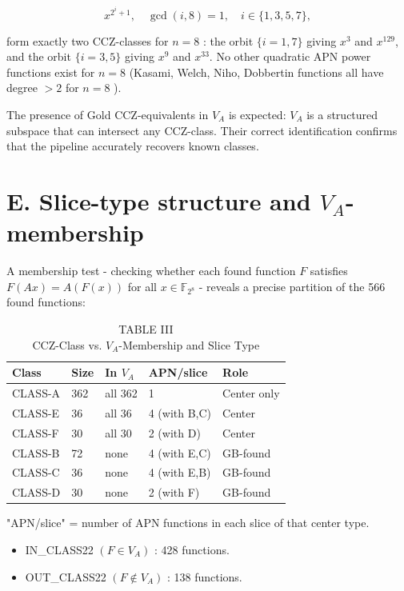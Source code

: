 \documentclass[10pt]{article}
\begin{document}
$$
x^{2^{i}+1}, \quad \operatorname{gcd}(i, 8)=1, \quad i \in\{1,3,5,7\},
$$

form exactly two CCZ-classes for $n=8$ : the orbit $\{i=1,7\}$ giving $x^{3}$ and $x^{129}$, and the orbit $\{i=3,5\}$ giving $x^{9}$ and $x^{33}$. No other quadratic APN power functions exist for $n=8$ (Kasami, Welch, Niho, Dobbertin functions all have degree $>2$ for $n=8$ ).

The presence of Gold CCZ-equivalents in $V_{A}$ is expected: $V_{A}$ is a structured subspace that can intersect any CCZ-class. Their correct identification confirms that the pipeline accurately recovers known classes.

\section*{E. Slice-type structure and $V_{A}$-membership}
A membership test - checking whether each found function $F$ satisfies $F(A x)=A(F(x))$ for all $x \in \mathbb{F}_{2^{8}}$ - reveals a precise partition of the 566 found functions:

\begin{table}[h]
\begin{center}
\captionsetup{labelformat=empty}
\caption{TABLE III\\
CCZ-Class vs. $V_{A}$-Membership and Slice Type}
\begin{tabular}{|l|l|l|l|l|}
\hline
Class & Size & In $V_{A}$ & APN/slice & Role \\
\hline
CLASS-A & 362 & all 362 & 1 & Center only \\
\hline
CLASS-E & 36 & all 36 & 4 (with B,C) & Center \\
\hline
CLASS-F & 30 & all 30 & 2 (with D) & Center \\
\hline
CLASS-B & 72 & none & 4 (with E,C) & GB-found \\
\hline
CLASS-C & 36 & none & 4 (with E,B) & GB-found \\
\hline
CLASS-D & 30 & none & 2 (with F) & GB-found \\
\hline
\end{tabular}
\end{center}
\end{table}

"APN/slice" = number of APN functions in each slice of that center type.

\begin{itemize}
  \item IN\_CLASS22 $\left(F \in V_{A}\right)$ : 428 functions.
  \item OUT\_CLASS22 $\left(F \notin V_{A}\right)$ : 138 functions.
\end{itemize}
\end{document}
